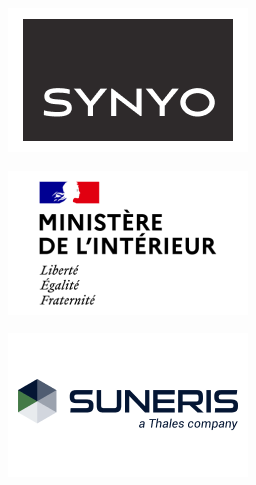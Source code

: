 \documentclass{beamer}
\begin{document}
\begin{frame}
{{\begin{minipage}{.15\textwidth}\includegraphics[width=\columnwidth]{../img/logo_synyo.png}\end{minipage}%
\begin{minipage}{.15\textwidth}\includegraphics[width=\columnwidth]{../img/logo_cta.png}\end{minipage}%
\begin{minipage}{.15\textwidth}\includegraphics[width=\columnwidth]{../img/logo_suneris.png}\end{minipage}%
}}
\end{frame}
\end{document}
